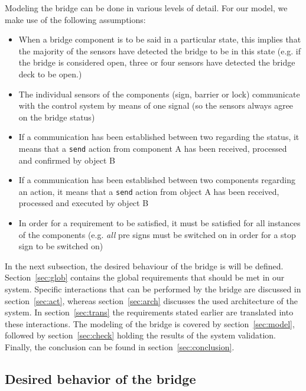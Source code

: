 Modeling the bridge can be done in various levels of detail. For our model, we make use of the following assumptions:
%
\begin{itemize}
	\item When a bridge component is to be said in a particular state, this implies that the majority of the sensors have detected the bridge to be in this state (e.g. if the bridge is considered open, three or four sensors have detected the bridge deck to be open.)
	\item The individual sensors of the components (sign, barrier or lock) communicate with the control system by means of one signal (so the sensors always agree on the bridge status)
	\item If a communication has been established between two regarding the status, it means that a \texttt{send} action from component A has been received, processed and confirmed by object B
	\item If a communication has been established between two components regarding an action, it means that a \texttt{send} action from object A has been received, processed and executed by object B
	\item In order for a requirement to be satisfied, it must be satisfied for all instances of the components (e.g. \emph{all} pre signs must be switched on in order for a stop sign to be switched on)
\end{itemize}
%
In the next subsection, the desired behaviour of the bridge is will be defined. Section~\ref{sec:glob} contains the global requirements that should be met in our system. Specific interactions that can be performed by the bridge are discussed in section~\ref{sec:act}, whereas section~\ref{sec:arch} discusses the used architecture of the system. In section~\ref{sec:trans} the requirements stated earlier are translated into these interactions. The modeling of the bridge is covered by section~\ref{sec:model}, followed by section~\ref{sec:check} holding the results of the system validation. Finally, the conclusion can be found in section~\ref{sec:conclusion}.

\subsection{Desired behavior of the bridge}

